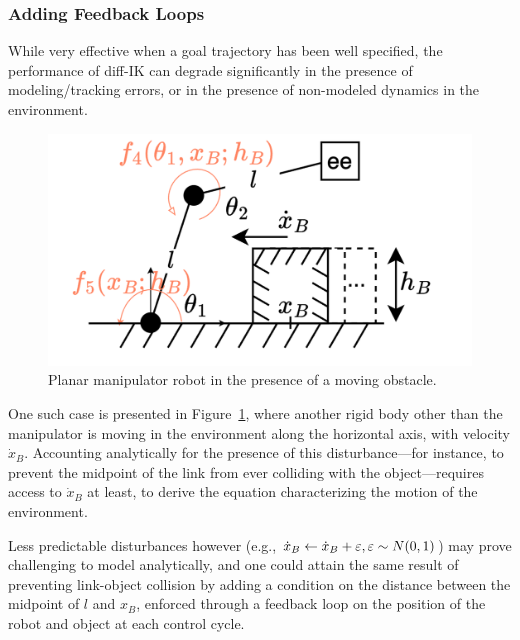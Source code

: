 \subsubsection{Adding Feedback Loops}
While very effective when a goal trajectory has been well specified, the performance of diff-IK can degrade significantly in the presence of modeling/tracking errors, or in the presence of non-modeled dynamics in the environment.

\begin{figure}
    \vspace{-\intextsep}
    \centering
    \includegraphics[width=\linewidth]{figures/ch2/ch2-planar-manipulator-floor-box.pdf}
    \caption{Planar manipulator robot in the presence of a moving obstacle.}
    \label{fig:planar-manipulator-box-velocity}
\end{figure}

One such case is presented in Figure~\ref{fig:planar-manipulator-box-velocity}, where another rigid body other than the manipulator is moving in the environment along the horizontal axis, with velocity \( \dot x_B \).
Accounting analytically for the presence of this disturbance---for instance, to prevent the midpoint of the link from ever colliding with the object---requires access to \( \dot x_B \) at least, to derive the equation characterizing the motion of the environment.

Less predictable disturbances however (e.g., \( \dot x_B \leftarrow \dot x_B + {\varepsilon}, {\varepsilon} \sim N(0,1) \)) may prove challenging to model analytically, and one could attain the same result of preventing link-object collision by adding a condition on the distance between the midpoint of \( l \) and \( x_B \), enforced through a feedback loop on the position of the robot and object at each control cycle.

